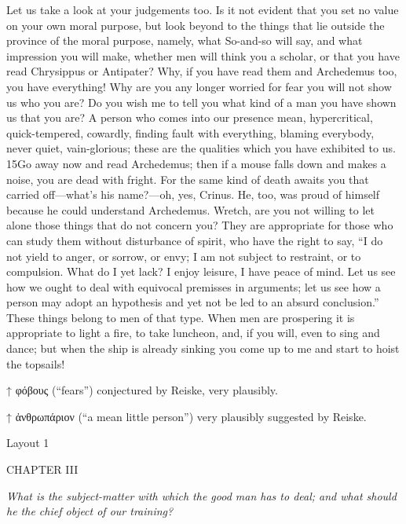 Let us take a look at your judgements too. Is it not evident that you set no value on your own moral purpose, but look beyond to the things that lie outside the province of the moral purpose, namely, what So-and-so will say, and what impression you will make, whether men will think you a scholar, or that you have read Chrysippus or Antipater? Why, if you have read them and Archedemus too, you have everything! Why are you any longer worried for fear you will not show us who you are? Do you wish me to tell you what kind of a man you have shown us that you are? A person who comes into our presence mean, hypercritical, quick-tempered, cowardly, finding fault with everything, blaming everybody, never quiet, vain-glorious; these are the qualities which you have exhibited to us. 15Go away now and read Archedemus; then if a mouse falls down and makes a noise, you are dead with fright. For the same kind of death awaits you that carried off—what's his name?—oh, yes, Crinus. He, too, was proud of himself because he could understand Archedemus. Wretch, are you not willing to let alone those things that do not concern you? They are appropriate for those who can study them without disturbance of spirit, who have the right to say, ``I do not yield to anger, or sorrow, or envy; I am not subject to restraint, or to compulsion. What do I yet lack? I enjoy leisure, I have peace of mind. Let us see how we ought to deal with equivocal premisses in arguments; let us see how a person may adopt an hypothesis and yet not be led to an absurd conclusion.'' These things belong to men of that type. When men are prospering it is appropriate to light a fire, to take luncheon, and, if you will, even to sing and dance; but when the ship is already sinking you come up to me and start to hoist the topsails!



↑ φόβους (``fears'') conjectured by Reiske, very plausibly.

↑ ἀνθρωπάριον (``a mean little person'') very plausibly suggested by Reiske.


Layout 1

CHAPTER III

\emph{What is the subject-matter with which the good man has to deal; and what should he the chief object of our training?}

